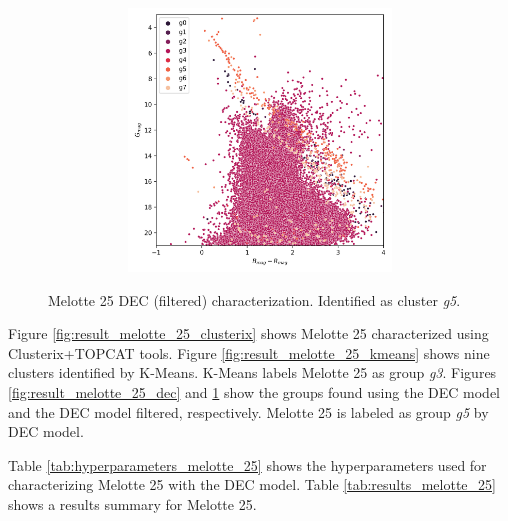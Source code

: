 \documentclass[11pt, a4paper, english]{book}
\begin{document}
\begin{figure}[H]
\begin{subfigure}{0.9\textwidth}
\begin{subfigure}[t]{0.30\textwidth}
    \end{subfigure}
    \hfill
    \begin{subfigure}[t]{0.30\textwidth}
      \centering
      \includegraphics[width=\textwidth]{../figures/melotte_25/dec_hr_diagram_filtered_melotte_25.png}
    \end{subfigure}
  \end{subfigure}
  \caption{Melotte 25 DEC (filtered) characterization. Identified as cluster \emph{g5}.}
  \label{fig:result_melotte_25_dec_filtered}
\end{figure}

\newpage

Figure \ref{fig:result_melotte_25_clusterix} shows Melotte 25 characterized using Clusterix+TOPCAT tools.
Figure \ref{fig:result_melotte_25_kmeans} shows nine clusters identified by K-Means.
K-Means labels Melotte 25 as group \emph{g3}.
Figures \ref{fig:result_melotte_25_dec} and \ref{fig:result_melotte_25_dec_filtered}
show the groups found using the DEC model and the DEC model filtered, respectively.
Melotte 25 is labeled as group \emph{g5} by DEC model.

Table \ref{tab:hyperparameters_melotte_25} shows the hyperparameters used for characterizing Melotte 25
with the DEC model. Table \ref{tab:results_melotte_25} shows a results summary for Melotte 25.
\end{document}
